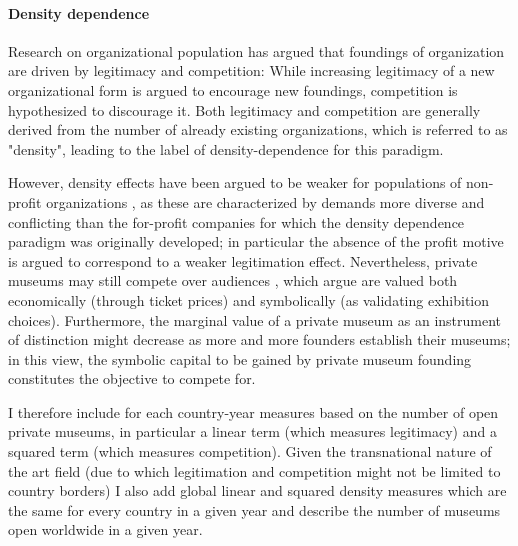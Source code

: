 \documentclass[11pt]{article}
\begin{document}
\paragraph*{Density dependence}

Research on organizational population \parencite{Carroll_1989_density,Hannan_1992_dynamics} has argued that foundings of organization are driven by legitimacy and competition:
While increasing legitimacy of a new organizational form is argued to encourage new foundings, competition is hypothesized to discourage it.
Both legitimacy and competition are generally derived from the number of already existing organizations, which is referred to as "density", leading to the label of density-dependence for this paradigm. 


However, density effects have been argued to be weaker for populations of non-profit organizations \parencite{Bogaert_etal_2014_ecological}, as these are characterized by demands more diverse and conflicting than the for-profit companies for which the density dependence paradigm was originally developed; in particular the absence of the profit motive is argued to correspond to a weaker legitimation effect. 
Nevertheless, private museums may still compete over audiences \parencite[p.14]{Adam_2021_rise}, which \textcite{Frey_Meier_2002_beyeler} argue are valued both economically (through ticket prices) and symbolically (as validating exhibition choices).
Furthermore, the marginal value of a private museum as an instrument of distinction might decrease as more and more founders establish their museums; in this view, the symbolic capital to be gained by private museum founding constitutes the objective to compete for. 



I therefore include for each country-year measures based on the number of open private museums, in particular a linear term (which measures legitimacy) and a squared term (which measures competition).
Given the transnational nature of the art field (due to which legitimation and competition might not be limited to country borders) I also add global linear and squared density measures which are the same for every country in a given year and describe the number of museums open worldwide in a given year.
\end{document}
